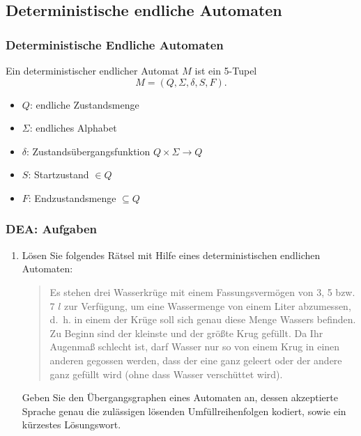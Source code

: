 \documentclass{beamer}
\begin{document}
\subsection{Deterministische endliche Automaten}
\begin{frame}
\frametitle{Deterministische Endliche Automaten}
        Ein deterministischer endlicher Automat $M$ ist ein 5-Tupel
        \[
        M= (Q,\Sigma,\delta,S,F).
        \]
        \begin{itemize}
        \item $Q$:  endliche Zustandsmenge
        \item $\Sigma$:    endliches Alphabet
        \item $\delta$:   Zustandsübergangsfunktion $Q\times \Sigma \rightarrow Q$
        \item $S$:   Startzustand $\in Q$
        \item $F$:   Endzustandsmenge $\subseteq Q$
        \end{itemize}
\end{frame}
\begin{frame}
	\frametitle{DEA: Aufgaben}
	\begin{enumerate}
	\item 
		Lösen Sie folgendes Rätsel mit Hilfe eines deterministischen
		endlichen Automaten:
		\begin{quote}
		  Es stehen drei Wasserkrüge mit einem Fassungsvermögen
		  von 3, 5 bzw. 7 $l$ zur Verfügung, um eine Wassermenge von
		  einem Liter abzumessen, d.~h. in einem der Krüge soll sich genau
		  diese Menge Wassers befinden. Zu Beginn sind der kleinste und
		  der größte Krug gefüllt. Da Ihr Augenmaß schlecht
		  ist, darf Wasser nur so von einem Krug in einen anderen
		  gegossen werden, dass der eine ganz geleert oder der andere
		  ganz gefüllt wird (ohne dass Wasser verschüttet wird).
		\end{quote}
		Geben Sie den Übergangsgraphen eines Automaten an, dessen
		akzeptierte Sprache genau die zulässigen lösenden
		Umfüllreihenfolgen kodiert, sowie ein kürzestes Lösungswort.
	\end{enumerate}
\end{frame}
\end{document}
